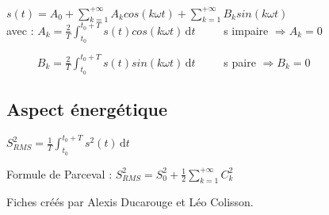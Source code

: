 \documentclass[9pt]{article}
\begin{document}
\begin{multicols*}{2}
$s(t) = A_{0} + \sum\limits_{k=1}^{+\infty} {A_{k} cos(k \omega t)} + \sum\limits_{k=1}^{+\infty} {B_{k} sin(k \omega t)}$\\

avec : $A_{k} = \frac{2}{T} \int_{t_{0}}^{t_{0}+T} s(t) cos(k \omega t) \, \mathrm{d}t$   $\>$ $\>$ $\>$  $\>$ s impaire $\Rightarrow A_{k} = 0 $

 $\>$ $\>$ $\>$ $\>$ $\>$ $B_{k} = \frac{2}{T} \int_{t_{0}}^{t_{0}+T} s(t) sin(k \omega t) \, \mathrm{d}t$  $\>$  $\>$ $\>$ $\>$ s paire $\Rightarrow B_{k} = 0 $
 
 
\subsection{Aspect énergétique}

$S_{RMS}^{2} = \frac{1}{T} \int_{t_{0}}^{t_{0}+T} s^{2}(t)  \, \mathrm{d}t$

Formule de Parceval : $S_{RMS}^{2} = S^{2}_{0} + \frac{1}{2}\sum\limits_{k=1}^{+\infty} {C^{2}_{k}}$


\footnotesize{Fiches créés par Alexis Ducarouge et Léo Colisson.}


\end{multicols*}
\end{document}
